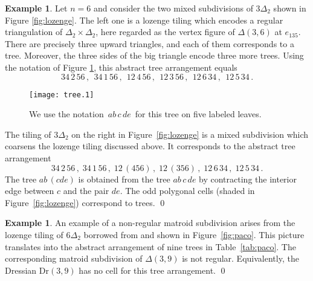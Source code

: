 \documentclass[12pt,a4paper]{amsart}
\theoremstyle{definition}
\newtheorem{example}[thm]{Example}
\newcommand{\Dr}{{\mathrm{Dr}}}
\begin{document}
\begin{example}\label{ex:lozenge}
  Let $n=6$ and consider the two mixed subdivisions of $3\Delta_2$
  shown in Figure \ref{fig:lozenge}.  The left one is a lozenge tiling
  which encodes a regular triangulation of $\Delta_2\times\Delta_2$,
  here regarded as the vertex figure of $\Delta(3,6)$ at $e_{135}$.
  There are precisely three upward triangles, and each of them
  corresponds to a tree.  Moreover, the three sides of the big
  triangle encode three more trees. Using the notation of Figure
  \ref{fig:tree5}, this abstract tree arrangement equals
  \begin{equation}
    \label{eq:FFFGG}
    34\, 2\, 56 \, , \;\, 34\, 1\, 56 \, , \;\, 12\, 4\, 56 \, , 
    \;\, 12\, 3\,  56 \, , \;\, 12\, 6\, 34 \, , \;\, 12\, 5\, 34 \, .
  \end{equation}

  \begin{figure}[htb]\centering
    \texttt{[image: tree.1]}
    \caption{We use the notation $\,ab\, c\, de\,$ for this tree on
      five labeled leaves.}
    \label{fig:tree5}
  \end{figure}

  The tiling of $3\Delta_2$ on the right in Figure~\ref{fig:lozenge}
  is a mixed subdivision which coarsens the lozenge tiling discussed
  above.  It corresponds to the abstract tree arrangement
  \[
  34\, 2\, 56 \, , \; 34\, 1\, 56 \, , \; 12\, (456) \, , \; 12\,
  (356) \, , \; 12\, 6\, 34 \, , \; 12\, 5\, 34 \, .
  \]
  The tree $ab\, (cde)$ is obtained from the tree $ab\, c\, de$ by
  contracting the interior edge between $c$ and the pair $de$.  The
  odd polygonal cells (shaded in Figure~\ref{fig:lozenge}) correspond
  to trees. \qed
\end{example}

\begin{example} \label{exa:paco} An example of a non-regular matroid
  subdivision arises from the lozenge tiling of $6 \Delta_2$ borrowed
  from \cite{S} and shown in Figure~\ref{fig:paco}.  This picture
  translates into the abstract arrangement of nine trees in
  Table~\ref{tab:paco}.  The corresponding matroid subdivision of
  $\Delta(3,9) $ is not regular.  Equivalently, the Dressian
  $\Dr(3,9)$ has no cell for this tree arrangement.  \qed
\end{example}
\end{document}
